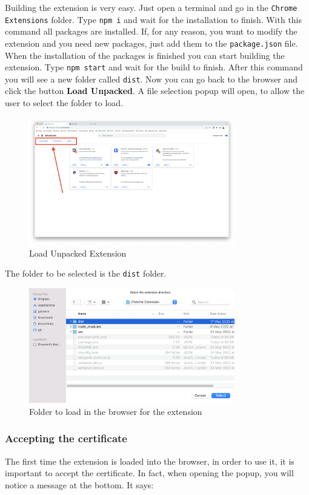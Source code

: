 Building the extension is very easy. Just open a terminal and go in the \texttt{Chrome Extensions} folder. Type \texttt{npm i} and wait for the installation to finish. With this command all packages are installed. If, for any reason, you want to modify the extension and you need new packages, just add them to the \texttt{package.json} file.
When the installation of the packages is finished you can start building the extension. Type \texttt{npm start} and wait for the build to finish. After this command you will see a new folder called \texttt{dist}.
Now you can go back to the browser and click the button \textbf{Load Unpacked}. A file selection popup will open, to allow the user to select the folder to load.
\begin{figure}[htb]
	\centering
	\includegraphics[width=0.8\textwidth]{images/extension/load-unpacked.png}
	\caption{Load Unpacked Extension}
	\label{fig:load_unpacked}
\end{figure}
The folder to be selected is the \texttt{dist} folder. 
\begin{figure}[htb]
	\centering
	\includegraphics[width=0.8\textwidth]{images/extension/dist.png}
	\caption{Folder to load in the browser for the extension}
	\label{fig:dist}
\end{figure}

\subsubsection{Accepting the certificate}
\label{sec:accept_certificate}
The first time the extension is loaded into the browser, in order to use it, it is important to accept the certificate. In fact, when opening the popup, you will notice a message at the bottom. It says:

